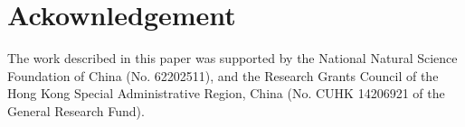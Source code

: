 \section*{Ackownledgement}
The work described in this paper was supported by the National Natural Science Foundation of China (No. 62202511), and the Research Grants Council of the Hong Kong Special Administrative Region, China (No. CUHK 14206921 of the General Research Fund).